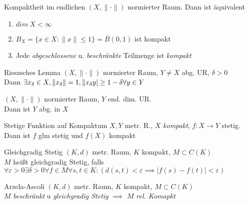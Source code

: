 \begin{satz}{Kompaktheit im endlichen}
  $(X, \|\cdot\|)$ normierter Raum. Dann ist äquivalent
  \begin{enumerate}[label = (\roman*)]
    \item $dim\ X < \infty$
    \item $B_X = \{x\in X: \|x\| \leq 1\} = \overline{B}(0,1)$ ist kompakt
    \item Jede \textit{abgeschlossene} u. \textit{beschränkte} Teilmenge ist
      \textit{kompakt}
  \end{enumerate}
\end{satz}

\begin{satz}{Rieszsches Lemma}
  $(X, \|\cdot\|)$ normierter Raum, $Y \neq X$ abg. UR, $\delta>0$\\
  Dann $\exists x_{\delta} \in X, \|x_{\delta}\| = 1,  \|x_{\delta}\-y|
  \geq 1-\delta \forall y \in Y$
\end{satz}

\begin{lemma}
  $(X, \|\cdot\|)$ normierter Raum, $Y$ end. dim. UR.\\
  Dann ist $Y$ abg. in $X$
\end{lemma}

\begin{satz}{Stetige Funktion auf Kompaktum}
  $X,Y$ metr. R., $X$ \textit{kompakt}, $f:X\to Y$ stetig.\\
  Dann ist $f$ glm stetig und $f(X)$ kompakt
\end{satz}

\begin{definition}{Gleichgradig Stetig}
  $(K,d)$ metr. Raum, $K$ kompakt, $M \subset C(K)$\\
  $M$ heißt gleichgradig Stetig, falls
  $\forall \varepsilon >0 \exists \delta >0 \forall f \in M \forall s,t \in K:
  (d(s,t) < \varepsilon \implies |f(s) - f(t)| < \varepsilon)$
\end{definition}

\begin{satz}{Arzela-Ascoli}
  $(K,d)$ metr. Raum, $K$ kompakt, $M \subset C(K)$\\
  $M$ \textit{beschränkt} u \textit{gleichgradig Stetig} $\implies$ $M$
  \textit{rel. Komapkt}
\end{satz}
